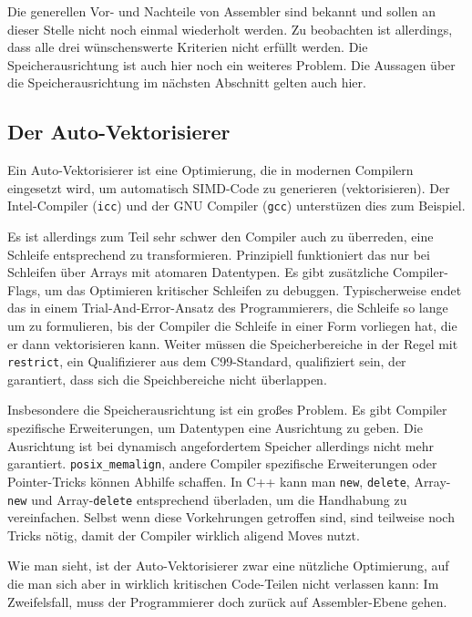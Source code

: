 \documentclass[a4paper,10pt]{article}
\begin{document}
Die generellen Vor- und Nachteile von Assembler sind bekannt und sollen an dieser Stelle nicht noch
einmal wiederholt werden. Zu beobachten ist allerdings, dass alle drei wünschenswerte Kriterien
nicht erfüllt werden. Die Speicherausrichtung ist auch hier noch ein weiteres Problem. Die Aussagen
über die Speicherausrichtung im nächsten Abschnitt gelten auch hier.

\subsection{Der Auto-Vektorisierer}

Ein Auto-Vektorisierer ist eine Optimierung, die in modernen Compilern eingesetzt wird, um
automatisch SIMD-Code zu generieren (vektorisieren). Der Intel-Compiler (\texttt{icc}) und der GNU
Compiler (\texttt{gcc}) unterstüzen dies zum Beispiel. 

Es ist allerdings zum Teil sehr schwer den Compiler auch zu überreden, eine Schleife entsprechend zu
transformieren. Prinzipiell funktioniert das nur bei Schleifen über Arrays mit atomaren Datentypen.
Es gibt zusätzliche Compiler-Flags, um das Optimieren kritischer Schleifen zu debuggen.
Typischerweise endet das in einem Trial-And-Error-Ansatz des Programmierers, die Schleife so lange
um zu formulieren, bis der Compiler die Schleife in einer Form vorliegen hat, die er dann
vektorisieren kann. Weiter müssen die Speicherbereiche in der Regel mit \texttt{restrict},
ein Qualifizierer aus dem C99-Standard, qualifiziert sein, der garantiert, dass sich die
Speichbereiche nicht überlappen.

Insbesondere die Speicherausrichtung ist ein großes Problem. Es gibt Compiler spezifische
Erweiterungen, um Datentypen eine Ausrichtung zu geben. Die Ausrichtung ist bei dynamisch
angefordertem Speicher allerdings nicht mehr garantiert. \texttt{posix\_memalign}, andere Compiler
spezifische Erweiterungen oder Pointer-Tricks können Abhilfe schaffen. In C++ kann man \texttt{new},
\texttt{delete}, Array-\texttt{new} und Array-\texttt{delete} entsprechend überladen, um die
Handhabung zu vereinfachen. Selbst wenn diese Vorkehrungen getroffen sind, sind teilweise noch
Tricks nötig, damit der Compiler wirklich aligend Moves nutzt.

Wie man sieht, ist der Auto-Vektorisierer zwar eine nützliche Optimierung, auf die man sich aber in wirklich
kritischen Code-Teilen nicht verlassen kann: Im Zweifelsfall, muss der Programmierer doch zurück auf 
Assembler-Ebene gehen.
\end{document}
